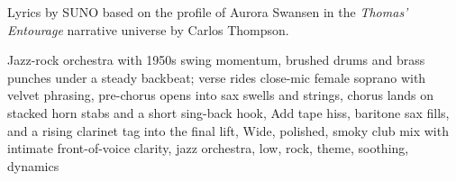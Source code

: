 
\begin{notes}
Lyrics by SUNO based on the profile of Aurora Swansen in the \emph{Thomas’ Entourage} narrative universe by Carlos Thompson.
\end{notes}
\begin{style}
Jazz-rock orchestra with 1950s swing momentum, brushed drums and brass punches under a steady backbeat; verse rides close-mic female soprano with velvet phrasing, pre-chorus opens into sax swells and strings, chorus lands on stacked horn stabs and a short sing-back hook, Add tape hiss, baritone sax fills, and a rising clarinet tag into the final lift, Wide, polished, smoky club mix with intimate front-of-voice clarity, jazz orchestra, low, rock, theme, soothing, dynamics
\end{style}
